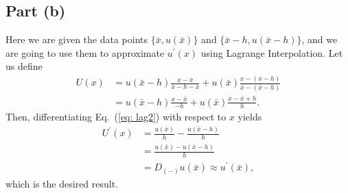 \documentclass[aps,prl,preprint,groupedaddress]{revtex4-1}
\newcommand{\xbar}{\bar{x}}
\begin{document}
\subsection{Part (b)}
Here we are given the data points $\{\bar{x},u(\bar{x})\}$ and $\{\bar{x}-h,u(\bar{x}-h)\}$, and we are going to use them to approximate $u^{\prime}(x)$ using Lagrange Interpolation. Let us define
\begin{align}\label{eq: lag2}
U(x) &= u(\xbar-h)\frac{x-\xbar}{\xbar-h-\xbar}+u(\xbar)\frac{x-(\xbar-h)}{\xbar-(\xbar-h)}\nonumber\\
&= u(\xbar-h)\frac{x-\xbar}{-h}+u(\xbar)\frac{x-\xbar+h}{h}.
\end{align}
Then, differentiating Eq.~(\ref{eq: lag2}) with respect to $x$ yields
\begin{align}\label{eq: dm}
U^{\prime}(x) &= \frac{u(\xbar)}{h} - \frac{u(\xbar-h)}{h}\nonumber\\
&= \frac{u(\xbar)-u(\xbar-h)}{h}\nonumber\\
&= D_{(-)}u(\xbar)\approx{u^{\prime}(\xbar)},
\end{align}
which is the desired result.
\end{document}
